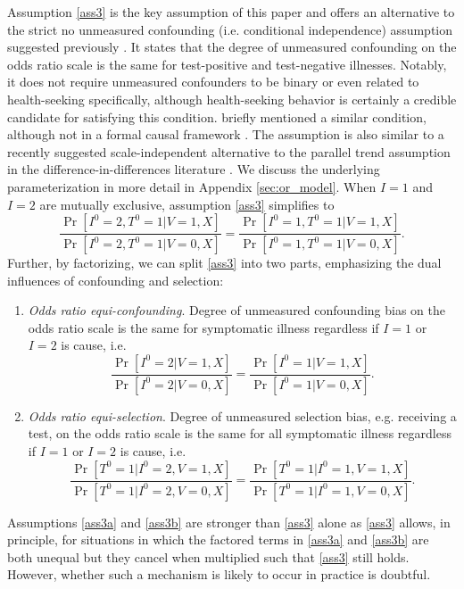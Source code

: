 \documentclass[11pt]{article}
\begin{document}
Assumption \ref{ass3} is the key assumption of this paper and offers an alternative to the strict no unmeasured confounding (i.e. conditional independence) assumption suggested previously \cite{schnitzer_estimands_2022}. It states that the degree of unmeasured confounding on the odds ratio scale is the same for test-positive and test-negative illnesses. Notably, it does not require unmeasured confounders to be binary or even related to health-seeking specifically, although health-seeking behavior is certainly a credible candidate for satisfying this condition. \citeauthor{lewnard_measurement_2018} briefly mentioned a similar condition, although not in a formal causal framework \cite{lewnard_measurement_2018}. The assumption is also similar to a recently suggested scale-independent alternative to the parallel trend assumption in the difference-in-differences literature \cite{park_universal_2023,tchetgen_universal_2023}. We discuss the underlying parameterization in more detail in Appendix \ref{sec:or_model}. When $I = 1$ and $I = 2$ are mutually exclusive, assumption  \ref{ass3} simplifies to
\begin{equation}\label{eqn:a3_simplified}
    \frac{\Pr[I^0 = 2, T^0 = 1 | V = 1, X]}{\Pr[I^0 = 2, T^0 = 1 | V = 0, X]} =\frac{\Pr[I^0 = 1, T^0 = 1 | V = 1, X]}{\Pr[I^0 = 1, T^0 = 1 | V = 0, X]}.
\end{equation}
Further, by factorizing, we can split \ref{ass3} into two parts, emphasizing the dual influences of confounding and selection:
\begin{enumerate}[label=\upshape(A3\alph*), ref=A3\alph*]
    \item\label{ass3a}  \textit{Odds ratio equi-confounding}. Degree of unmeasured confounding bias on the odds ratio scale is the same for symptomatic illness regardless if $I=1$ or $I=2$ is cause, i.e. 
    $$\frac{\Pr[I^0 = 2 | V = 1, X]}{\Pr[I^0 = 2 | V = 0, X]} =\frac{\Pr[I^0 = 1 | V = 1, X]}{\Pr[I^0 = 1 | V = 0, X]}.$$
    \item\label{ass3b} \textit{Odds ratio equi-selection}. Degree of unmeasured selection bias, e.g. receiving a test, on the odds ratio scale is the same for all symptomatic illness regardless if $I=1$ or $I=2$ is cause, i.e. 
    $$\frac{\Pr[T^0 = 1 | I^0 = 2, V = 1, X]}{\Pr[T^0 = 1 | I^0 = 2, V = 0, X]} =\frac{\Pr[T^0 = 1 | I^0 = 1, V = 1, X]}{\Pr[T^0 = 1 | I^0 = 1, V = 0, X]}.$$
\end{enumerate}
Assumptions \ref{ass3a} and \ref{ass3b} are stronger than \ref{ass3} alone as \ref{ass3} allows, in principle, for situations in which the factored terms in \ref{ass3a} and \ref{ass3b} are both unequal but they cancel when multiplied such that \ref{ass3} still holds. However, whether such a mechanism is likely to occur in practice is doubtful.
\end{document}
